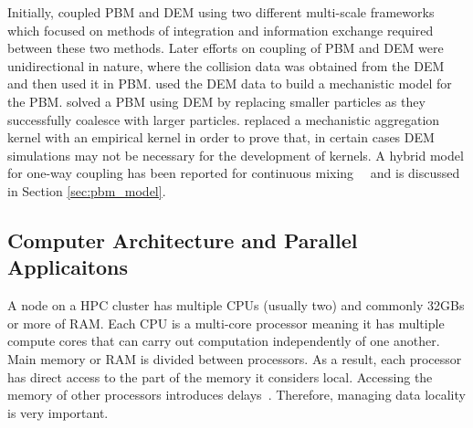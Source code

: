 \documentclass[preprint,11pt,authoryear]{elsarticle}
\newcommand{\jhanote}[1]{ {\textcolor{red} { ***shantenu: #1 }}}
\newcommand{\csnote}[1]{ {\textcolor{blue} { ***chaitanya: #1 }}}
\newcommand{\gpnote}[1]{{\textcolor{green} {***giannis: #1}}}
\newcommand{\fbnote}[1]{{\textcolor{cyan} { ***franklin: #1 }}}
\newcommand{\jhanote}[1]{ {\textcolor{red} { ***shantenu: #1 }}}
\newcommand{\csnote}[1]{}
\newcommand{\gpnote}[1]{}
\begin{document}
Initially, \cite{ingram2004} coupled PBM and DEM using two different multi-scale frameworks which 
focused on methods of integration and information exchange required between these two methods. 
Later efforts on coupling of PBM and DEM were unidirectional in nature, where the collision 
data was obtained from the DEM and then used it in PBM. \cite{gantt2006} used the DEM data 
to build a mechanistic model for the PBM. \cite{Goldschmidt2003} solved a PBM using DEM by 
replacing smaller particles as they successfully coalesce with larger particles. 
\cite{Reinhold2012} replaced a mechanistic aggregation kernel with an empirical kernel 
in order to prove that, in certain cases DEM simulations may not be necessary for the 
development of kernels. A hybrid model for one-way coupling has been reported for continuous 
mixing~\citep{sen2013}~\citep{sen2013b} and is discussed in Section \ref{sec:pbm_model}.
%
% 

\subsection{Computer Architecture and Parallel Applicaitons}


A node on a HPC cluster has multiple CPUs (usually two) and commonly 32GBs or more of RAM. 
Each CPU is a multi-core processor meaning it has multiple compute cores that can carry 
out computation independently of one another. Main memory or RAM is divided between processors.
As a result, each processor has direct access to the part of the memory it considers local.
Accessing the memory of other processors introduces delays~\cite{Jin2011}. 
Therefore, managing data locality is very important.
 
\end{document}
